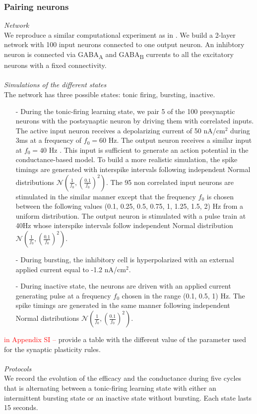 \subsubsection{Pairing neurons}
\textit{Network}\\
We reproduce a similar computational experiment as in \citep{gonzalez-rueda_activity-dependent_2018}. We build a 2-layer network with 100 input neurons connected to one output neuron. An inhibtory neuron is connected via GABA\textsubscript{A} and GABA\textsubscript{B} currents to all the excitatory neurons with a fixed connectivity.\\
~\\
\textit{Simulations of the different states}\\
The network has three possible states: tonic firing, bursting, inactive.
\begin{itemize}
\item[-] During the tonic-firing learning state, we pair 5 of the 100 presynaptic neurons with the postsynaptic neuron by driving them with correlated inputs. The active input neuron receives a depolarizing current of 50 nA/cm$^2$ during 3ms at a frequency of $f_0 = 60$ Hz. The output neuron receives a similar input at $f_0 =40 $ Hz \citep{gurunathan_spurious_2020}. This input is sufficient to generate an action potential in the conductance-based model. To build a more realistic simulation, the spike timings are generated with interspike intervals following independent Normal distributions $\mathcal{N}(\frac{1}{f_0}, (\frac{\num{0.1}}{f_0})^{2})$. The 95 non correlated input neurons are stimulated in the similar manner except that the frequency $f_0$ is chosen between the following values (0.1, 0.25, 0.5, 0.75, 1, 1.25, 1.5, 2) Hz  from a uniform distribution. The output neuron is stimulated with a pulse train at 40Hz whose interspike intervals follow independent Normal distribution $\mathcal{N}(\frac{1}{f_0}, (\frac{\num{0.1}}{f_0})^{2})$.
\item[-] During bursting, the inhibitory cell is hyperpolarized with an external applied current equal to -1.2 nA/cm$^2$. 
\item[-] During inactive state, the neurons are driven with an applied current generating pulse at a frequency $f_0$ chosen in the range (0.1, 0.5, 1) Hz.   The spike timings are generated in the same manner following independent Normal distributions  $\mathcal{N}(\frac{1}{f_0}, (\frac{\num{0.1}}{f_0})^{2})$. 
\end{itemize}
\textcolor{red}{in Appendix SI -- } provide a table with the different value of the parameter used for the synaptic plasticity rules. \\
~\\
\textit{Protocols}\\
We record the evolution of the efficacy and the conductance during five cycles that is alternating between a tonic-firing learning state with either an intermittent bursting state or an inactive state without bursting. Each state lasts 15 seconds.

